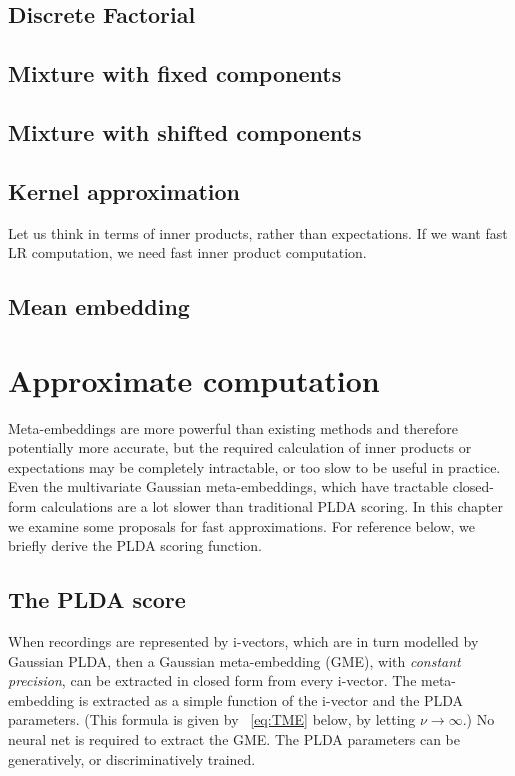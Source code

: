 \documentclass[a4paper,oneside,12pt,english]{report}
\begin{document}
 


\section{Discrete Factorial}

\section{Mixture with fixed components}

\section{Mixture with shifted components}


\section{Kernel approximation}
Let us think in terms of inner products, rather than expectations. If we want fast LR computation, we need fast inner product computation. 



\section{Mean embedding}


\chapter{Approximate computation}
Meta-embeddings are more powerful than existing methods and therefore potentially more accurate, but the required calculation of inner products or expectations may be completely intractable, or too slow to be useful in practice. Even the multivariate Gaussian meta-embeddings, which have tractable closed-form calculations are a lot slower than traditional PLDA scoring. In this chapter we examine some proposals for fast approximations. For reference below, we briefly derive the PLDA scoring function.


\section{The PLDA score}
When recordings are represented by i-vectors, which are in turn modelled by Gaussian PLDA, then a Gaussian meta-embedding (GME), with \emph{constant precision}, can be extracted in closed form from every i-vector. The meta-embedding is extracted as a simple function of the i-vector and the PLDA parameters. (This formula is given by ~\eqref{eq:TME} below, by letting $\nu\to\infty$.) No neural net is required to extract the GME. The PLDA parameters can be generatively, or discriminatively trained. 
\end{document}
